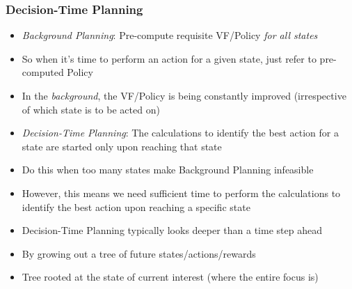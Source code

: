 \documentclass[handout]{beamer}
\begin{document}
\begin{frame}
\frametitle{Decision-Time Planning}
\pause
\begin{itemize}[<+->]
\item {\em Background Planning}:  Pre-compute requisite VF/Policy {\em for all states}
\item So when it's time to perform an action for a given state, just refer to pre-computed Policy
\item In the {\em background}, the VF/Policy  is being constantly improved (irrespective of which state is to be acted on)
\item {\em Decision-Time Planning}: The calculations to identify the best action for a state are started only upon reaching that state
\item Do this when too many states make Background Planning infeasible
\item However, this means we need sufficient time to perform the calculations to identify the best action upon reaching a specific state
\item Decision-Time Planning typically looks deeper than a time step ahead
\item By growing out a tree of future states/actions/rewards
\item Tree rooted at the state of current interest (where the entire focus is)
\end{itemize}
\end{frame}
\end{document}
